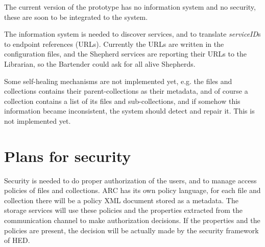 \documentclass{book}
\begin{document}
The current version of the prototype has no information system and no security, these are soon to be integrated to the system.

The information system is needed to discover services, and to translate \emph{serviceID}s to endpoint references (URLs). Currently the URLs are written in the configuration files, and the Shepherd services are reporting their URLs to the Librarian, so the Bartender could ask for all alive Shepherds.

Some self-healing mechanisms are not implemented yet, e.g. the files and collections contains their parent-collections as their metadata, and of course a collection contains a list of its files and sub-collections, and if somehow this information became inconsistent, the system should detect and repair it. This is not implemented yet.

\section{Plans for security} %
\label{sec:plans_for_security}

Security is needed to do proper authorization of the users, and to manage access policies of files and collections. ARC has its own policy language, for each file and collection there will be a policy XML document stored as a metadata. The storage services will use these policies and the properties extracted from the communication channel to make authorization decisions. If the properties and the policies are present, the decision will be actually made by the security framework of HED.
\end{document}

